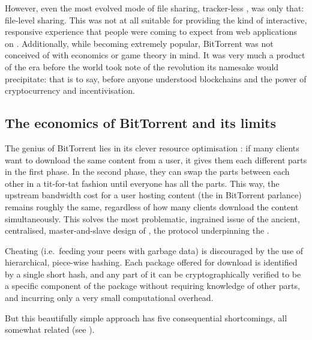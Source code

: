 However, even the most evolved mode of  file sharing, tracker-less  \cite{pouwelse2005bittorrent}, was only that: file-level sharing. This was not at all suitable for providing the kind of interactive, responsive experience that people were coming to expect from web applications on . Additionally, while becoming extremely popular, BitTorrent was not conceived of with economics or game theory in mind. It was very much a product of the era before the world took note of the revolution its namesake would precipitate: that is to say, before anyone understood blockchains and the power of cryptocurrency and incentivisation.

\subsection{The economics of BitTorrent and its limits \statusgreen}

The genius of BitTorrent lies in its clever resource optimisation \cite{cohen2003incentives}: if many clients want to download the same content from a user, it gives them each different parts in the first phase. In the second phase, they can swap the parts between each other in a tit-for-tat fashion until everyone has all the parts. This way, the upstream bandwidth cost for a user hosting content (the  in BitTorrent parlance) remains roughly the same, regardless of how many clients download the content simultaneously. This solves the most problematic, ingrained issue of the ancient, centralised, master-and-slave design of , the protocol underpinning the .

Cheating (i.e.\ feeding your peers with garbage data) is discouraged by the use of hierarchical, piece-wise hashing. Each package offered for download is identified by a single short hash, and any part of it can be cryptographically verified to be a specific component of the package without requiring knowledge of other parts, and incurring only a very small computational overhead. 

But this beautifully simple approach has five consequential shortcomings, all somewhat related (see \cite{locher2006free,piatek2007incentives}).


